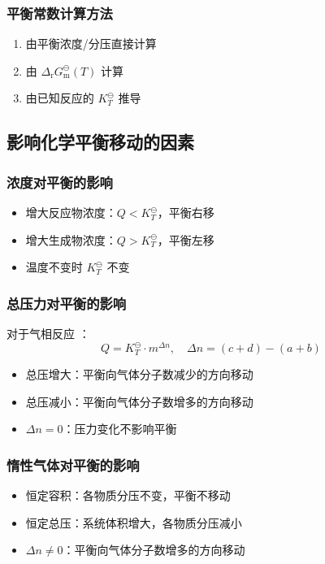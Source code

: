 \subsubsection{平衡常数计算方法}
\begin{enumerate}
\item 由平衡浓度/分压直接计算
\item 由 $\Delta_{\text{r}} G_{\text{m}}^\ominus(T)$ 计算
\item 由已知反应的 $K_T^\ominus$ 推导
\end{enumerate}

\subsection{影响化学平衡移动的因素}
\subsubsection{浓度对平衡的影响}
\begin{itemize}
\item 增大反应物浓度：$Q < K_T^\ominus$，平衡右移
\item 增大生成物浓度：$Q > K_T^\ominus$，平衡左移
\item 温度不变时 $K_T^\ominus$ 不变
\end{itemize}

\subsubsection{总压力对平衡的影响}
对于气相反应 ：
\[
Q = K_T^\ominus \cdot m^{\Delta n}, \quad \Delta n = (c+d) - (a+b)
\]
\begin{itemize}
\item 总压增大：平衡向气体分子数减少的方向移动
\item 总压减小：平衡向气体分子数增多的方向移动
\item $\Delta n = 0$：压力变化不影响平衡
\end{itemize}

\subsubsection{惰性气体对平衡的影响}
\begin{itemize}
\item 恒定容积：各物质分压不变，平衡不移动
\item 恒定总压：系统体积增大，各物质分压减小
\item $\Delta n \neq 0$：平衡向气体分子数增多的方向移动
\end{itemize}

